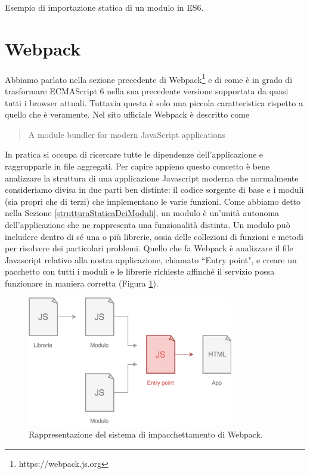 \begin{listing}[ht]
\inputminted{Javascript}{sources/exampleImportExportES6.js}
\caption{Esempio di importazione statica di un modulo in ES6.} 
\label{exampleImportExportES6} 
\end{listing}

\section{Webpack}
Abbiamo parlato nella sezione precedente di Webpack\footnote{https://webpack.js.org} e di come è in grado di trasformare ECMAScript 6 nella sua precedente versione supportata da quasi tutti i browser attuali. Tuttavia questa è solo una piccola caratteristica rispetto a quello che è veramente.
Nel sito ufficiale Webpack è descritto come \blockquote{A module bundler for modern JavaScript applications}. In pratica si occupa di ricercare tutte le dipendenze dell'applicazione e raggrupparle in file aggregati. 
Per capire appieno questo concetto è bene analizzare la struttura di una applicazione Javascript moderna che normalmente consideriamo divisa in due parti ben distinte: il codice sorgente di base e i moduli (sia propri che di terzi) che implementano le varie funzioni. Come abbiamo detto nella Sezione \ref{strutturaStaticaDeiModuli}, un modulo è un'unità autonoma dell'applicazione che ne rappresenta una funzionalità distinta. Un modulo può includere dentro di sé una o più librerie, ossia delle collezioni di funzioni e metodi per risolvere dei particolari problemi. Quello che fa Webpack è analizzare il file Javascript relativo alla nostra applicazione, chiamato “Entry point", e creare un pacchetto con tutti i moduli e le librerie richieste affinché il servizio possa funzionare in maniera corretta (Figura \ref{webpackWorkflow}). 

\begin{figure}[h]
\centering
\includegraphics[width=9cm]{./images/webpackWorkflow}
\caption{Rappresentazione del sistema di impacchettamento di Webpack.}
\label{webpackWorkflow}
\end{figure}

